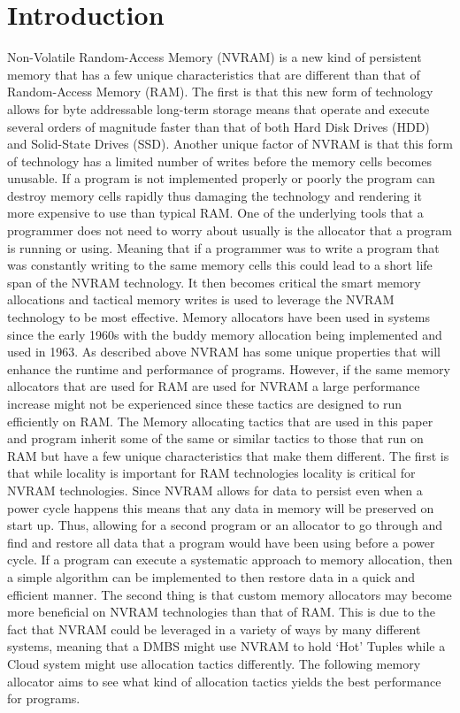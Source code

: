 \documentclass[conference]{IEEEtran}
\begin{document}
\section{Introduction}
Non-Volatile Random-Access Memory (NVRAM) is a new kind of persistent memory that has a few unique characteristics that are different than that of Random-Access Memory (RAM).  The first is that this new form of technology allows for byte addressable long-term storage means that operate and execute several orders of magnitude faster than that of both Hard Disk Drives (HDD) and Solid-State Drives (SSD). Another unique factor of NVRAM is that this form of technology has a limited number of writes before the memory cells becomes unusable. If a program is not implemented properly or poorly the program can destroy memory cells rapidly thus damaging the technology and rendering it more expensive to use than typical RAM. One of the underlying tools that a programmer does not need to worry about usually is the allocator that a program is running or using.  Meaning that if a programmer was to write a program that was constantly writing to the same memory cells this could lead to a short life span of the NVRAM technology. It then becomes critical the smart memory allocations and tactical memory writes is used to leverage the NVRAM technology to be most effective. 
Memory allocators have been used in systems since the early 1960s with the buddy memory allocation being implemented and used in 1963. As described above NVRAM has some unique properties that will enhance the runtime and performance of programs. However, if the same memory allocators that are used for RAM are used for NVRAM a large performance increase might not be experienced since these tactics are designed to run efficiently on RAM. The Memory allocating tactics that are used in this paper and program inherit some of the same or similar tactics to those that run on RAM but have a few unique characteristics that make them different. The first is that while locality is important for RAM technologies locality is critical for NVRAM technologies. Since NVRAM allows for data to persist even when a power cycle happens this means that any data in memory will be preserved on start up. Thus, allowing for a second program or an allocator to go through and find and restore all data that a program would have been using before a power cycle.  If a program can execute a systematic approach to memory allocation, then a simple algorithm can be implemented to then restore data in a quick and efficient manner. The second thing is that custom memory allocators may become more beneficial on NVRAM technologies than that of RAM. This is due to the fact that NVRAM could be leveraged in a variety of ways by many different systems, meaning that a DMBS might use NVRAM to hold ‘Hot’ Tuples while a Cloud system might use allocation tactics differently.  The following memory allocator aims to see what kind of allocation tactics yields the best performance for programs. 
\end{document}
